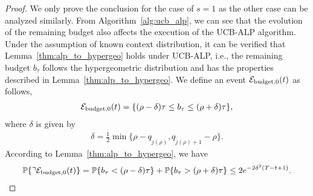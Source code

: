 \begin{proof}
We only prove the conclusion for the case of $s = 1$ as the other case can be analyzed similarly.
From Algorithm~\ref{alg:ucb_alp}, we can see that the evolution of the remaining budget also affects the execution of the UCB-ALP algorithm. Under the assumption of known context distribution, it can be verified that Lemma~\ref{thm:alp_to_hypergeo} holds under UCB-ALP, i.e., the remaining budget $b_{\tau}$ follows the hypergeometric distribution and has the properties described in Lemma~\ref{thm:alp_to_hypergeo}. We define an event $\mathcal{E}_{\rm budget, 0}(t)$ as follows,
\begin{eqnarray}
\mathcal{E}_{\rm budget, 0}(t)  = \{(\rho - \delta) \tau \leq b_{\tau} \leq (\rho + \delta) \tau\}, \nonumber
\end{eqnarray}
where $\delta$ is given by
\begin{eqnarray}
\delta = \frac{1}{2}\min\{\rho - q_{\tilde{j}(\rho)}, q_{\tilde{j}(\rho)+1} -\rho\}. \nonumber
\end{eqnarray}
According to Lemma~\ref{thm:alp_to_hypergeo}, we have
\begin{eqnarray}
\mathbb{P}\{\urcorner\mathcal{E}_{\rm budget, 0}(t)\}
= \mathbb{P}\{ b_{\tau} <  (\rho -\delta) \tau\} + \mathbb{P}\{ b_{\tau} >  (\rho +\delta) \tau\} \leq 2e^{-2\delta^2 (T-t + 1)}. \nonumber
\end{eqnarray}


\end{proof}
